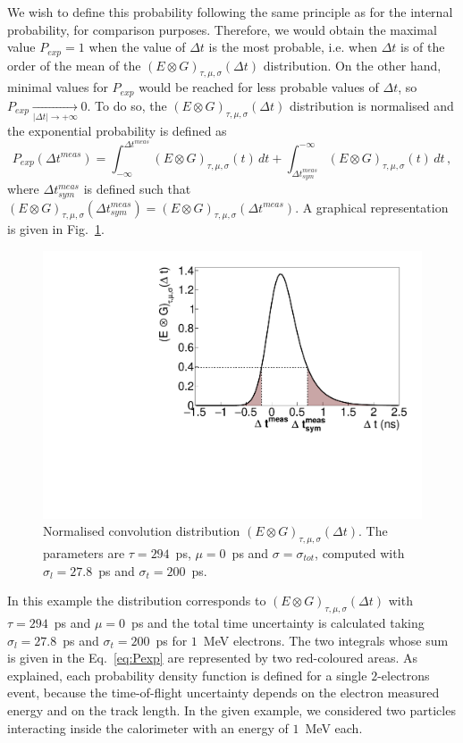 We wish to define this probability following the same principle as for the internal probability, for comparison purposes.
Therefore, we would obtain the maximal value ${P_{exp}=1}$ when the value of $\Delta t$ is the most probable, i.e. when $\Delta t$ is of the order of the mean of the ${(E \otimes G)_{\tau,\mu,\sigma}(\Delta t)}$ distribution.
On the other hand, minimal values for $P_{exp}$ would be reached for less probable values of $\Delta t$, so ${P_{exp} \xrightarrow[|\Delta t| \rightarrow +\infty]{} 0}$.
To do so, the ${(E \otimes G)_{\tau,\mu,\sigma}(\Delta t)}$ distribution is normalised and the exponential probability is defined as
\begin{equation}
  P_{exp}(\Delta t^{meas}) = \int_{-\infty}^{\Delta t^{meas}} (E \otimes G)_{\tau,\mu,\sigma}(t)\, dt + \int_{\Delta t_{sym}^{meas}}^{-\infty} (E \otimes G)_{\tau,\mu,\sigma}(t)\, dt\,,
  \label{eq:Pexp}
\end{equation}
where $\Delta t^{meas}_{sym}$ is defined such that ${(E \otimes G)_{\tau,\mu,\sigma}(\Delta t^{meas}_{sym})} = {(E \otimes G)_{\tau,\mu,\sigma}(\Delta t^{meas})}$.
A graphical representation is given in Fig.~\ref{fig:Pexp}.
\begin{figure}[!h]
  \centering
  \includegraphics[width=13cm]{timedifference/fig_timediff/proba_expo_test.pdf}
  \caption{Normalised convolution distribution ${(E \otimes G)_{\tau,\mu,\sigma}(\Delta t)}$.
    The parameters are $\tau=294$~ps, $\mu=0$~ps and $\sigma=\sigma_{tot}$, computed with $\sigma_{l}=27.8$~ps and $\sigma_{t}=200$~ps.
    \label{fig:Pexp}}
\end{figure}
In this example the distribution corresponds to ${(E \otimes G)_{\tau,\mu,\sigma}(\Delta t)}$ with ${\tau=294}$~ps and ${\mu=0}$~ps and the total time uncertainty is calculated taking $\sigma_{l}=27.8$~ps and $\sigma_{t}=200$~ps for $1$~MeV electrons.
The two integrals whose sum is given in the Eq.~\eqref{eq:Pexp} are represented by two red-coloured areas.
As explained, each probability density function is defined for a single $2$-electrons event, because the time-of-flight uncertainty depends on the electron measured energy and on the track length.
In the given example, we considered two particles interacting inside the calorimeter with an energy of $1$~MeV each.

